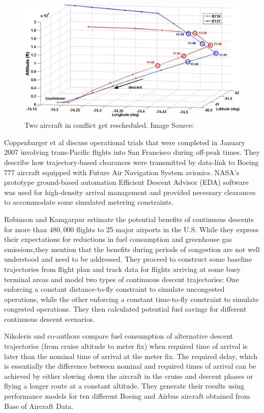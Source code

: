 \documentclass{aer1315-pretty}
\begin{document}
\begin{figure}[!h]
\centering
\includegraphics[height=0.4\textwidth]{figures/reschedule.jpg}
	\caption{Two aircraft in conflict get rescheduled. Image Source: \cite{Cao:2011}}	
	\label{fig:Rescheduled_Aircraft}
\end{figure}

Coppenbarger et al \cite{Copp:2007} discuss operational trials that were completed in January 2007 involving trans-Pacific flights into San Francisco during off-peak times. They describe how trajectory-based clearances were transmitted by data-link to Boeing 777 aircraft equipped with Future Air Navigation System avionics. NASA’s prototype ground-based automation Efficient Descent Advisor (EDA) software was  used for high-density arrival management and provided necessary clearances to accommodate some simulated metering constraints. \par

Robinson and Kamgarpur \cite{Rob:2010} estimate the potential benefits of continuous descents for more than $480,000$ flights to 25 major airports in the U.S. While they express their expectations for reductions in fuel consumption and greenhouse gas emissions,they mention that the benefits during periods of congestion are not well understood and need to be addressed. They proceed to construct some baseline trajectories  from flight plan and track data for flights arriving at some busy terminal areas and model two types of continuous descent trajectories: One enforcing a constant distance-to-fly constraint to simulate uncongested operations, while the other enforcing a constant time-to-fly constraint to simulate congested operations. They then calculated potential fuel savings for different continuous descent scenarios. \par

Nikoleris and co-authors \cite{Niko:2012} compare fuel consumption of alternative descent trajectories (from cruise altitude to meter fix) when required time of arrival is later than the nominal time of arrival at the meter fix. The required delay, which is essentially the difference between nominal and required times of arrival can be achieved by either slowing down the aircraft in the cruise and descent phases or flying a longer route at a constant altitude. They generate their results using performance models for ten different Boeing and Airbus aircraft obtained from Base of Aircraft Data. \par
\end{document}
